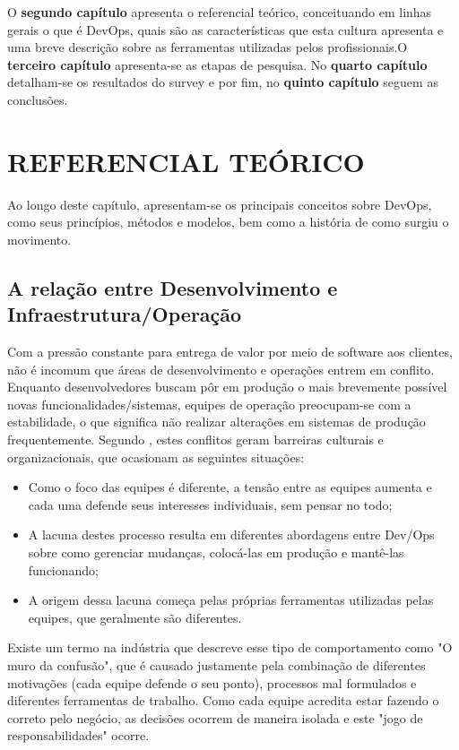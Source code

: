 \documentclass[twoside,english,brazilian]{UNISINOSartigo}
\begin{document}
O \textbf{segundo capítulo} apresenta o referencial teórico, conceituando em linhas gerais o que é DevOps, quais são as características que esta cultura apresenta e uma breve descrição sobre as ferramentas utilizadas pelos profissionais.O \textbf{terceiro capítulo} apresenta-se as etapas de pesquisa. No \textbf{quarto capítulo} detalham-se os resultados do survey e por fim, no \textbf{quinto capítulo} seguem as conclusões.
\section{REFERENCIAL TEÓRICO}
	Ao longo deste capítulo, apresentam-se os principais conceitos sobre DevOps, como seus princípios, métodos e modelos, bem como a história de como surgiu o movimento.

\subsection{A relação entre Desenvolvimento  e Infraestrutura/Operação}

Com a pressão constante para entrega de valor por meio de software aos clientes, não é incomum que áreas de desenvolvimento e operações entrem em conflito. Enquanto desenvolvedores buscam pôr em produção o mais brevemente possível novas funcionalidades/sistemas, equipes de operação preocupam-se com a estabilidade, o que significa não realizar alterações em sistemas de produção frequentemente.
Segundo , estes conflitos geram barreiras culturais e organizacionais, que ocasionam as seguintes situações:

\begin{itemize}
\item Como o foco das equipes é diferente, a tensão entre as equipes aumenta e cada uma defende seus interesses individuais, sem pensar no todo;
\item A lacuna destes processo resulta em diferentes abordagens entre Dev/Ops sobre como gerenciar mudanças, colocá-las em produção e mantê-las funcionando;
\item  A origem dessa lacuna começa pelas próprias ferramentas utilizadas pelas equipes, que geralmente são diferentes.
\end{itemize}

Existe um termo na indústria que descreve esse tipo de comportamento como "O muro da confusão", que é causado justamente pela combinação de diferentes motivações (cada equipe defende o seu ponto), processos mal formulados e diferentes ferramentas de trabalho. Como cada equipe acredita estar fazendo o correto pelo negócio, as decisões ocorrem de maneira isolada e este "jogo de responsabilidades" ocorre.
% 
% 
\end{document}
